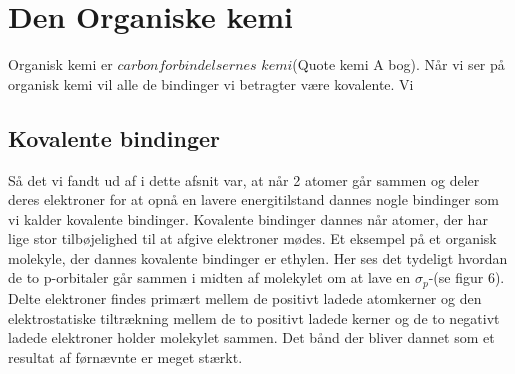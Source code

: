 \section{Den Organiske kemi}
Organisk kemi er $carbonforbindelsernes$ $kemi$(Quote kemi A bog). Når vi ser på organisk kemi vil alle de bindinger vi betragter være kovalente. Vi 


\subsection{Kovalente bindinger}
Så det vi fandt ud af i dette afsnit var, at når 2 atomer går sammen og deler deres elektroner for at opnå en lavere energitilstand dannes nogle bindinger som vi kalder kovalente bindinger. Kovalente bindinger dannes når atomer, der har lige stor tilbøjelighed til at afgive elektroner mødes. Et eksempel på et organisk molekyle, der dannes kovalente bindinger er ethylen. Her ses det tydeligt hvordan de to p-orbitaler går sammen i midten af molekylet om at lave en $\sigma_p$-(se figur 6). Delte elektroner findes primært mellem de positivt ladede atomkerner og den elektrostatiske tiltrækning mellem de to positivt ladede kerner og de to negativt ladede elektroner holder molekylet sammen. Det bånd der bliver dannet som et resultat af førnævnte er meget stærkt.
